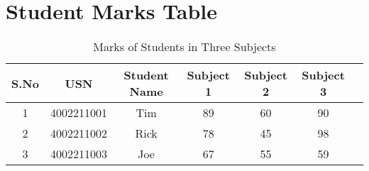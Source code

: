 \documentclass[a4paper,12pt]{article}
\begin{document}
\section*{Student Marks Table}

\begin{table}[h!]
\centering
\caption{Marks of Students in Three Subjects}
\begin{tabular}{|c|c|c|c|c|c|c|}
\hline
\textbf{S.No} & \textbf{USN} & \textbf{Student Name} & \textbf{Subject 1} & \textbf{Subject 2} & \textbf{Subject 3} \\
\hline
1 & 4002211001 & Tim & 89 & 60 & 90 \\
2 & 4002211002 & Rick& 78 & 45 & 98 \\
3 & 4002211003 & Joe & 67 & 55 & 59 \\
\hline
\end{tabular}
\end{table}
\end{document}
